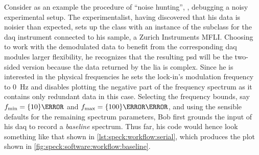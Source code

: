 Consider as an example the procedure of \enquote{noise hunting}, \ie, debugging a noisy experimental setup.
The experimentalist,
having discovered that his data is noisier than expected, sets up the  class with an instance of the  subclass for the \gls{daq} instrument connected to his sample, a Zurich Instruments MFLI.
Choosing to work with the demodulated data to benefit from the corresponding \acrshort{daq} modules larger flexibility, he recognizes that the resulting \gls{psd} will be the two-sided version because the data returned by the \gls{lia} is complex.
Since he is interested in the physical frequencies
he sets the lock-in's modulation frequency to \qty{0}{\hertz} and disables plotting the negative part of the frequency spectrum as it contains only redundant data in this case.
Selecting the frequency bounds, say $\fmin = \qty{10}{\hertz}$ and $\fmax = \qty{100}{\kilo\hertz}$, and using the sensible defaults for the remaining spectrum parameters, Bob first grounds the input of his \gls{daq} to record a \emph{baseline} spectrum.
Thus far, his code would hence look something like that shown in \cref{lst:speck:workflow:serial}, which produces the plot shown in \cref{fig:speck:software:workflow:baseline}.

